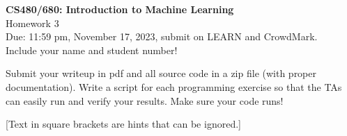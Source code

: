 \documentclass[10pt,letter,notitlepage]{article}
\newcounter{exercise}
\begin{document}
\begin{center}
\large{\textbf{CS480/680: Introduction to Machine Learning} \\ Homework 3\\ Due: 11:59 pm, November 17, 2023, submit on LEARN and CrowdMark.} \\

Include your name and student number!

\end{center}

\begin{center}
Submit your writeup in pdf and all source code in a zip file (with proper documentation). Write a script for each programming exercise so that the TAs can easily run and verify your results. Make sure your code runs!

[Text in square brackets are hints that can be ignored.]
\end{center}
\end{document}
